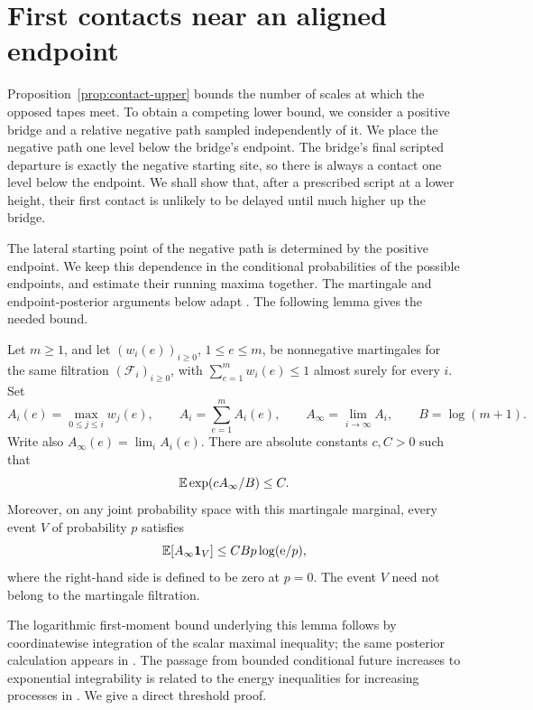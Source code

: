 \section{First contacts near an aligned endpoint}\label{sec:posteriors}

Proposition~\ref{prop:contact-upper} bounds the number of scales at which
the opposed tapes meet.  To obtain a competing lower bound, we consider a
positive bridge and a relative negative path sampled independently of
it.  We place the negative path one level below the bridge's endpoint.
The bridge's final scripted departure is exactly the
negative starting site, so there is always a contact one level below
the endpoint.  We shall show that,
after a prescribed script at a lower height, their first contact is
unlikely to be delayed until much higher up the bridge.

The lateral starting point of the negative path is determined by the
positive endpoint.  We keep this dependence in the conditional
probabilities of the possible endpoints, and estimate their running
maxima together.  The martingale and endpoint-posterior arguments below
adapt \cite[Lemma~6.1 and Proposition~6.2]{OpenAI2026}.  The following
lemma gives the needed bound.

\begin{lemma}\label{lem:posterior-max}
Let \(m\ge1\), and let \((w_i(e))_{i\ge0}\), \(1\le e\le m\), be
nonnegative martingales for the same filtration \((\mathcal F_i)_{i\ge0}\), with
\(\sum_{e=1}^m w_i(e)\le1\) almost surely for every \(i\).  Set
\[
 A_i(e)=\max_{0\le j\le i}w_j(e),\qquad
 A_i=\sum_{e=1}^m A_i(e),\qquad
 A_\infty=\lim_{i\to\infty}A_i,
 \qquad B=\log(m+1).
\]
Write also \(A_\infty(e)=\lim_i A_i(e)\).
There are absolute constants \(c,C>0\) such that
\begin{equation}\label{eq:posterior-exponential}
 \mathbb E\exp(cA_\infty/B)\le C.
\end{equation}
Moreover, on any joint probability space with this martingale marginal,
every event \(V\) of probability \(p\) satisfies
\begin{equation}\label{eq:event-weighted-max}
 \mathbb E[A_\infty\mathbf 1_V]
 \le CBp\log(\mathrm e/p),
\end{equation}
where the right-hand side is defined to be zero at \(p=0\).
The event \(V\) need not belong to the martingale filtration.
\end{lemma}

The logarithmic first-moment bound underlying this lemma follows by
coordinatewise integration of the scalar maximal inequality; the same
posterior calculation appears in
\cite[Section~1.1]{KesselheimMolinaroPattonSingla2026}.
The passage from bounded conditional future increases to exponential
integrability is related to the energy inequalities for increasing
processes in \cite[Theorem~4 and its corollary]{Kikuchi1992}.
We give a direct threshold proof.

